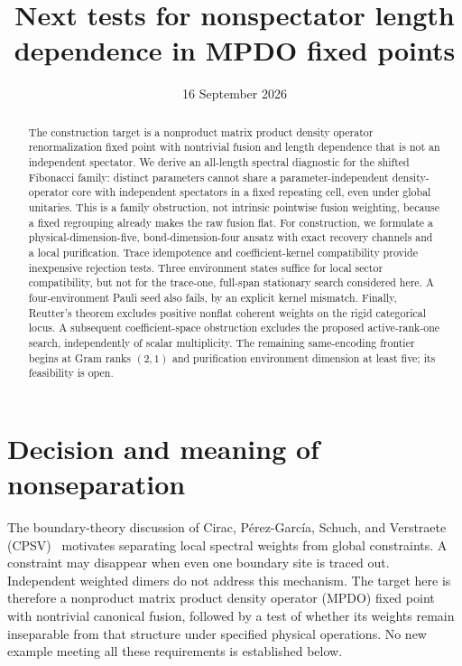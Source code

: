 \documentclass[aps,pra,reprint,nofootinbib,onecolumn]{revtex4-2}
\begin{document}
\title{Next tests for nonspectator length dependence in MPDO fixed points}
\date{16 September 2026}
\begin{abstract}
	The construction target is a nonproduct matrix product density operator
	renormalization fixed point with nontrivial fusion and length dependence
	that is not an independent spectator. We derive an all-length spectral
	diagnostic for the shifted Fibonacci family: distinct parameters cannot
	share a parameter-independent density-operator core with independent
	spectators in a fixed repeating cell, even under global unitaries.
	This is a family obstruction, not intrinsic pointwise fusion weighting,
	because a fixed regrouping already makes the raw fusion flat.
	For construction, we formulate a physical-dimension-five,
	bond-dimension-four ansatz with exact recovery channels and a local
	purification. Trace idempotence and coefficient-kernel compatibility
	provide inexpensive rejection tests. Three environment states suffice
	for local sector compatibility, but not for the trace-one, full-span
	stationary search considered here. A four-environment Pauli seed also
	fails, by an explicit kernel mismatch. Finally, Reutter's theorem
	excludes positive nonflat coherent weights on the rigid categorical
	locus. A subsequent coefficient-space obstruction excludes the proposed
	active-rank-one search, independently of scalar multiplicity. The
	remaining same-encoding frontier begins at Gram ranks $(2,1)$ and
	purification environment dimension at least five; its feasibility is open.
\end{abstract}
\maketitle

\section{Decision and meaning of nonseparation}
\label{sec:decision}

The boundary-theory discussion of Cirac, P\'erez-Garc\'ia, Schuch,
and Verstraete (CPSV)~\cite{CPSV} motivates separating local spectral
weights from global constraints. A constraint may disappear when even
one boundary site is traced out. Independent weighted dimers do not
address this mechanism. The target here is therefore a nonproduct
matrix product density operator (MPDO) fixed point with nontrivial
canonical fusion, followed by a test of whether its weights remain
inseparable from that structure under specified physical operations.
No new example meeting all these requirements is established below.
\end{document}
